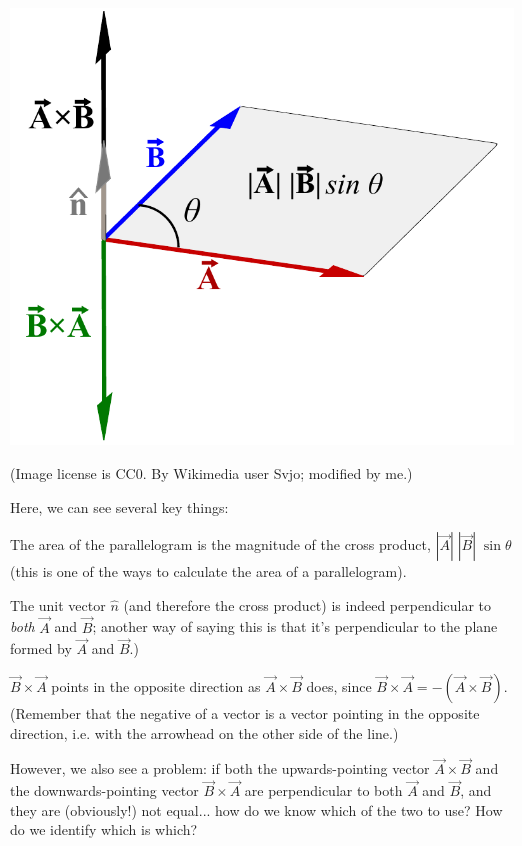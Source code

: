 \documentclass[8.01x]{subfiles}
\begin{document}
\includegraphics[scale=0.5]{Graphics/vectors/cross-product-with-area}

(Image license is CC0. By Wikimedia user Svjo; modified by me.)

Here, we can see several key things:
\begin{itemize*}
\item The area of the parallelogram is the magnitude of the cross product, $|\vec{A}| \; |\vec{B}| \; \sin{\theta}$ (this is one of the ways to calculate the area of a parallelogram).
\item The unit vector $\hat{n}$ (and therefore the cross product) is indeed perpendicular to \emph{both} $\vec{A}$ and $\vec{B}$; another way of saying this is that it's perpendicular to the plane formed by $\vec{A}$ and $\vec{B}$.)
\item $\vec{B} \times \vec{A}$ points in the opposite direction as $\vec{A} \times \vec{B}$ does, since $\vec{B} \times \vec{A} = -(\vec{A} \times \vec{B})$. (Remember that the negative of a vector is a vector pointing in the opposite direction, i.e. with the arrowhead on the other side of the line.)
\end{itemize*}

However, we also see a problem: if both the upwards-pointing vector $\vec{A} \times \vec{B}$ and the downwards-pointing vector $\vec{B} \times \vec{A}$ are perpendicular to both $\vec{A}$ and $\vec{B}$, and they are (obviously!) not equal... how do we know which of the two to use? How do we identify which is which?
\end{document}
